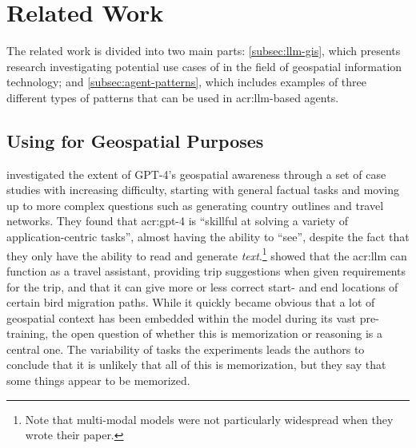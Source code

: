 \section{Related Work}
\label{sec:related-work}

The related work is divided into two main parts: \autoref{subsec:llm-gis}, which presents research investigating potential use cases of  in the field of geospatial information technology; and \autoref{subsec:agent-patterns}, which includes examples of three different types of patterns that can be used in \acrshort{acr:llm}-based agents.

\subsection[Using LLMs for Geospatial Purposes]{Using  for Geospatial Purposes}
\label{subsec:llm-gis}

\cite{robertsGPT4GEOHowLanguage2023} investigated the extent of GPT-4's geospatial awareness through a set of case studies with increasing difficulty, starting with general factual tasks and moving up to more complex questions such as generating country outlines and travel networks. They found that \acrshort{acr:gpt}-4 is \enquote{skillful at solving a variety of application-centric tasks}, almost having the ability to \enquote{see}, despite the fact that they only have the ability to read and generate \textit{text}.\footnote{Note that multi-modal models were not particularly widespread when they wrote their paper.} \citeauthor{robertsGPT4GEOHowLanguage2023} showed that the \acrshort{acr:llm} can function as a travel assistant, providing trip suggestions when given requirements for the trip, and that it can give more or less correct start- and end locations of certain bird migration paths. While it quickly became obvious that a lot of geospatial context has been embedded within the model during its vast pre-training, the open question of whether this is memorization or reasoning is a central one. The variability of tasks the experiments leads the authors to conclude that it is unlikely that all of this is memorization, but they say that some things appear to be memorized.

